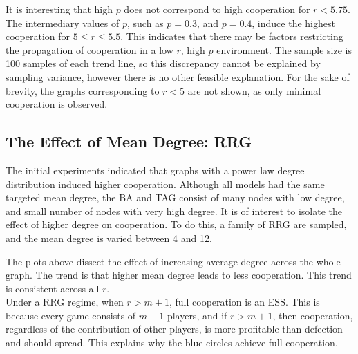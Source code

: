 It is interesting that high $p$ does not correspond to high cooperation for $r<5.75$. The intermediary values of $p$, such as $p=0.3$, and $p=0.4$, induce the highest cooperation for $5\leq r \leq 5.5$. This indicates that there may be factors restricting the propagation of cooperation in a low $r$, high $p$ environment. The sample size is 100 samples of each trend line, so this discrepancy cannot be explained by sampling variance, however there is no other feasible explanation. For the sake of brevity, the graphs corresponding to $r<5$ are not shown, as only minimal cooperation is observed. 


\subsection{The Effect of Mean Degree: RRG}
The initial experiments indicated that graphs with a power law degree distribution induced higher cooperation. Although all models had the same targeted mean degree, the BA and TAG consist of many nodes with low degree, and  small number of nodes with very high degree. It is of interest to isolate the effect of higher degree on cooperation. To do this, a family of RRG are sampled, and the mean degree is varied between 4 and 12. \\

 \FloatBarrier

 \FloatBarrier


The plots above dissect the effect of increasing average degree across the whole graph. The trend is that higher mean degree leads to less cooperation. This trend is consistent across all $r$. \\

Under a RRG regime, when $r>m+1$, full cooperation is an ESS. This is because every game consists of $m+1$ players, and if $r>m+1$, then cooperation, regardless of the contribution of other players, is more profitable than defection and should spread. This explains why the blue circles achieve full cooperation. \\

